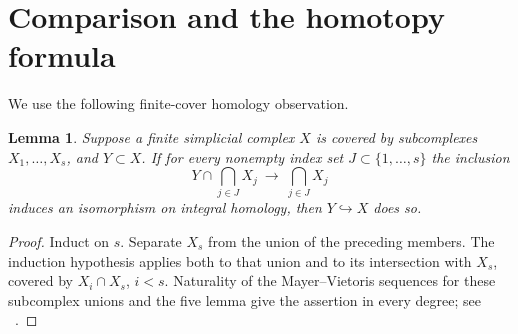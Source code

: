 \documentclass[11pt]{amsart}
\newtheorem{lemma}[theorem]{Lemma}
\begin{document}
\section{Comparison and the homotopy formula}

We use the following finite-cover homology observation.

\begin{lemma}\label{lem:comparison}
Suppose a finite simplicial complex \(X\) is covered by subcomplexes
\(X_1,\ldots,X_s\), and \(Y\subset X\). If for every nonempty index set
\(J\subset\{1,\ldots,s\}\) the inclusion
\[
Y\cap\bigcap_{j\in J}X_j\ \longrightarrow\ \bigcap_{j\in J}X_j
\]
induces an isomorphism on integral homology, then \(Y\hookrightarrow X\)
does so.
\end{lemma}

\begin{proof}
Induct on \(s\). Separate \(X_s\) from the union of the preceding
members. The induction hypothesis applies both to that union and to
its intersection with \(X_s\), covered by \(X_i\cap X_s\), \(i<s\).
Naturality of the Mayer--Vietoris sequences for these subcomplex unions
and the five lemma give the assertion in every degree; see
~\cite[Section~2.2, pp.~149--150]{hatcher}.
\end{proof}
\end{document}
